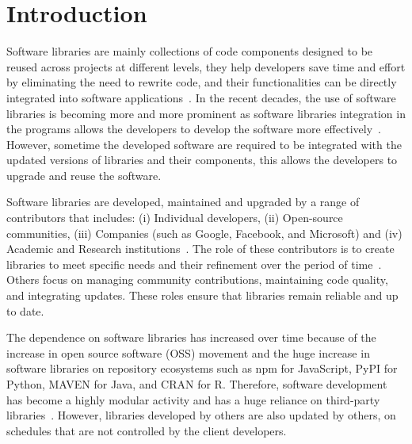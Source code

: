 \chapter{Introduction}
Software libraries are mainly collections of code components designed to be reused
across projects at different levels, they help developers save time and effort by
eliminating the need to rewrite code, and their functionalities can be directly integrated
into software applications~\cite{Sawant2015APIUsage}. In the recent decades, the use of software libraries is
becoming more and more prominent as software libraries integration in the programs
allows the developers to develop the software more effectively~\cite{Cybulski2007requirements}. However, sometime
the developed software are required to be integrated with the updated versions of
libraries and their components, this allows the developers to upgrade and reuse the
software.

Software libraries are developed, maintained and upgraded by a range of contributors
that includes: (i) Individual developers, (ii) Open-source communities, (iii) Companies
(such as Google, Facebook, and Microsoft) and (iv) Academic and Research
institutions~\cite{Lakhani2000OSS}. The role of these contributors is to create libraries to meet specific needs
and their refinement over the period of time~\cite{Decan2018npm}. Others focus on managing community
contributions, maintaining code quality, and integrating updates. These roles ensure that
libraries remain reliable and up to date.

The dependence on software libraries has increased over time because of the increase in open source software (OSS) movement and the huge increase in software libraries on repository ecosystems such as npm for JavaScript, PyPI for Python, MAVEN for Java, and CRAN for R. Therefore, software development has become a highly modular activity and has a huge reliance on third-party libraries~\cite{decan2019empirical, kalliamvakou2014promises, zerouali2019formal, cox2019surviving}. However, libraries developed by others are also updated by others, on schedules that are not controlled by the client developers.


